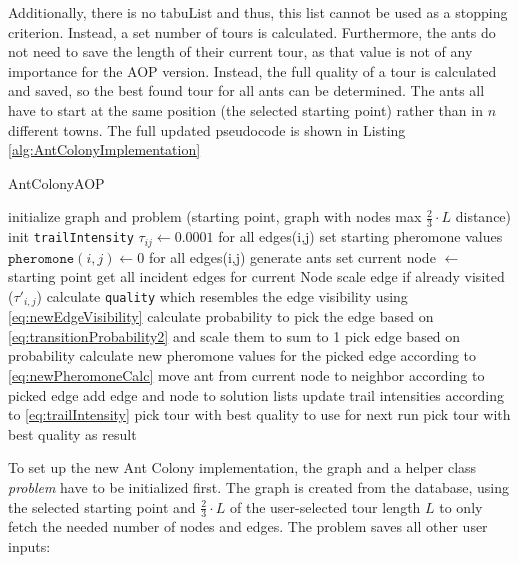 Additionally, there is no tabuList and thus, this list cannot be used as a stopping criterion. 
Instead, a set number of tours is calculated.
Furthermore, the ants do not need to save the length of their current tour, as that value is not of any importance for the AOP version. 
Instead, the full quality of a tour is calculated and saved, so the best found tour for all ants can be determined.
The ants all have to start at the same position (the selected starting point) rather than in $n$ different towns. 
The full updated pseudocode is shown in Listing \ref{alg:AntColonyImplementation}


\begin{breakablealgorithm}
	\caption{AntColonyAOP}
	\label{alg:AntColonyImplementation}
	\begin{algorithmic}[1]
		\STATE initialize graph and problem (starting point, graph with nodes max $\frac{2}{3} \cdot L$ distance)
		\STATE init \texttt{trailIntensity} $\tau_{ij} \gets 0.0001$ for all edges(i,j)
		\STATE set starting pheromone values $\texttt{pheromone}(i,j) \gets 0$ for all edges(i,j)
		\STATE generate ants
		\STATE set current node $\gets$ starting point
		\STATE get all incident edges for current Node
		\STATE scale edge if already visited ($\tau'_{i,j}$)
		\STATE calculate \texttt{quality} which resembles the edge visibility using \ref{eq:newEdgeVisibility}
		\ENDFOR
		\STATE calculate probability to pick the edge based on \ref{eq:transitionProbability2} and scale them to sum to 1
		\STATE pick edge based on probability
		\STATE calculate new pheromone values for the picked edge according to \ref{eq:newPheromoneCalc}
		\STATE move ant from current node to neighbor according to picked edge 
		\STATE add edge and node to solution lists
		\ENDWHILE
		\ENDFOR
		\STATE update trail intensities according to \ref{eq:trailIntensity}
		\STATE pick tour with best quality to use for next run
		\ENDFOR
		\STATE pick tour with best quality as result
	\end{algorithmic}	
\end{breakablealgorithm}

To set up the new Ant Colony implementation, the graph and a helper class \textit{problem} have to be initialized first. 
The graph is created from the database, using the selected starting point and $\frac{2}{3} \cdot L$ of the user-selected tour length $L$ to only fetch the needed number of nodes and edges.
The problem saves all other user inputs:


